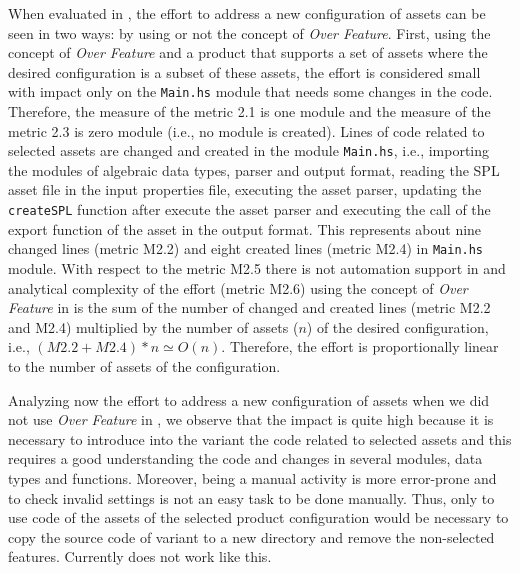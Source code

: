 When evaluated in \hp{}, the effort to address a new configuration of assets can be seen in two ways: by using or not the concept of \textit{Over Feature}.  First, using the concept of \textit{Over Feature} and a \hp{} product that supports a set of assets where the desired configuration is a subset of these assets, the effort is considered small with impact only on the \texttt{Main.hs} module that needs some changes in the code. Therefore, the measure of the metric 2.1 is one module and the measure of the metric 2.3 is zero module (i.e., no module is created). Lines of code related to selected assets are changed and created in the module \texttt{Main.hs}, i.e., importing the modules of algebraic data types, parser and output format, reading the SPL asset file in the input \hp{} properties file, executing the asset parser, updating the \texttt{createSPL} function after execute the asset parser and executing the call of the export function of the asset in the output format. This represents about nine changed lines (metric M2.2) and eight created lines (metric M2.4) in \texttt{Main.hs} module.  With respect to the metric M2.5 there is not automation support in \hp{} and analytical complexity of the effort (metric M2.6) using the concept of \textit{Over Feature} in \hp{} is the sum of the number of changed and created lines (metric M2.2 and M2.4) multiplied by the number of assets ($n$) of the desired configuration, i.e., $(M2.2 + M2.4) * n \simeq O(n)$. Therefore, the effort is proportionally linear to the number of assets of the configuration.

Analyzing now the effort to address a new configuration of assets when we did not use \textit{Over Feature} in \hp{}, we observe that the impact is quite high because it is necessary to introduce into the \hp{} variant the code related to selected assets and this requires a good understanding the code and changes in several modules, data types and functions. Moreover, being a manual activity is more error-prone and to check invalid settings is not an easy task to be done manually. Thus, only to use code of the assets of the selected product configuration would be necessary to copy the source code of \hp{} variant to a new directory and remove the non-selected features. Currently \hp{} does not work like this.

